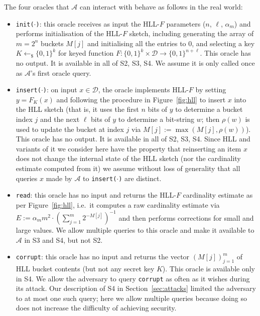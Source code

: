 \documentclass[sigconf, anonymous, dvipsnames]{acmart} %
\begin{document}
The four oracles that  ${\mathcal{A}}$ can interact with behave as follows in the real world:
\begin{itemize}
\item \texttt{init($\cdot$)}: this oracle receives as input the HLL-$F$ parameters ($n$, $\ell$, $\alpha_m$) and performs initialisation of the HLL-$F$ sketch, including generating the array of $m=2^n$ buckets $M[j]$ and initialising all the entries to $0$, and selecting a key $K \leftarrow_{\$} \{0,1\}^k$ for keyed function $F: \{0,1\}^k \times {{\mathcal{D}}} \rightarrow  \{0,1\}^{n+\ell}$. This oracle has no output. It is available in all of S2, S3, S4. We assume it is only called once as ${\mathcal{A}}$'s first oracle query.
\item \texttt{insert($\cdot$)}: on input $x \in {{\mathcal{D}}}$, the oracle implements HLL-$F$ by setting $y = F_K(x)$ and following the procedure in Figure~\ref{fig:hll} to insert $x$ into the HLL sketch (that is, it uses the first $n$ bits of $y$ to determine a bucket index $j$ and the next $\ell$ bits of $y$ to determine a bit-string $w$; then $\rho(w)$ is used to update the bucket at index $j$ via $M[j]:= \max(M[j],\rho(w))$). This oracle has no output. It is available in all of S2, S3, S4. Since HLL and variants of it we consider here have the property that reinserting an item $x$ does not change the internal state of the HLL sketch (nor the cardinality estimate computed from it) we assume without loss of generality that all queries $x$ made by ${\mathcal{A}}$ to \texttt{insert($\cdot$)} are distinct.
\item \texttt{read}: this oracle has no input and returns the HLL-$F$ cardinality estimate as per Figure~\ref{fig:hll}, i.e.\ it computes a raw cardinality estimate via $E := \alpha_mm^2\cdot(\sum_{j=1}^m2^{-M[j]})^{-1}$ and then performs corrections for small and large values. We allow multiple queries to this oracle and make it available to ${\mathcal{A}}$ in S3 and S4, but not S2.
\item \texttt{corrupt}: this oracle has no input and returns the vector $(M[j])_{j=1}^{m}$ of HLL bucket contents (but not any secret key $K$). This oracle is available only in S4. We allow the adversary to query \texttt{corrupt} as often as it wishes during its attack. Our description of S4 in Section~\ref{sec:attacks} limited the adversary to at most one such query; here we allow multiple queries because doing so does not increase the difficulty of achieving security.  
\end{itemize}
\end{document}
